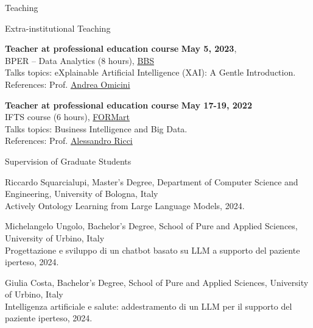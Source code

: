 \documentclass{resume} %
\begin{document}
\begin{rSection}{Teaching}
        \begin{rSubsection2}{Extra-institutional Teaching}
            \item\textbf{ Teacher at professional education course }\hfill \textbf{May 5, 2023},
            \\BPER -- Data Analytics (8 hours), \href{https://www.bbs.unibo.eu/}{BBS}
            \\Talks topics: eXplainable Artificial Intelligence (XAI): A Gentle Introduction.
            \\References:  Prof. \href{mailto:andrea.omicini@unibo.it}{Andrea Omicini}
            \item\textbf{ Teacher at professional education course }\hfill \textbf{May 17-19, 2022}
            \\IFTS course (6 hours), \href{http://www.formart.it/home}{FORMart}
            \\Talks topics: Business Intelligence and Big Data.
            \\References:  Prof. \href{mailto:a.ricci@unibo.it}{Alessandro Ricci}
        \end{rSubsection2}


        \begin{rSubsection2}{Supervision of Graduate Students}

            \item Riccardo Squarcialupi, Master's Degree, Department of Computer Science and Engineering, University of Bologna, Italy
            \\ Actively Ontology Learning from Large Language Models, 2024.
            \item Michelangelo Ungolo, Bachelor's Degree, School of Pure and Applied Sciences, University of Urbino, Italy
            \\ Progettazione e sviluppo di un chatbot basato su LLM a supporto del paziente iperteso, 2024.
            \item Giulia Costa, Bachelor's Degree, School of Pure and Applied Sciences, University of Urbino, Italy
            \\ Intelligenza artificiale e salute: addestramento di un LLM per il supporto del paziente iperteso, 2024.


\end{rSubsection2}
\end{rSection}
\end{document}

